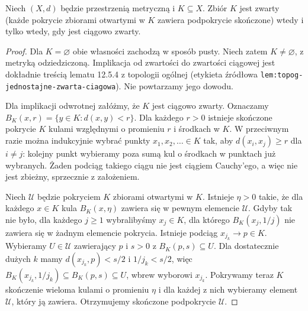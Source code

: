 \begin{twierdzenie}
\label{ma2:thm:metric-seqcompact}
Niech $(X,d)$ będzie przestrzenią metryczną i $K\subseteq X$.
Zbiór $K$ jest zwarty (każde pokrycie zbiorami otwartymi
w $K$ zawiera podpokrycie skończone) wtedy i tylko wtedy,
gdy jest ciągowo zwarty.
\end{twierdzenie}
\begin{proof}
Dla $K=\varnothing$ obie własności zachodzą w sposób pusty.
Niech zatem $K\ne\varnothing$, z metryką odziedziczoną.
Implikacja od zwartości do zwartości ciągowej jest
dokładnie treścią lematu 12.5.4 z topologii ogólnej
(etykieta źródłowa \texttt{lem:topog-jednostajne-zwarta-ciagowa}).
Nie powtarzamy jego dowodu.

Dla implikacji odwrotnej załóżmy, że $K$ jest ciągowo zwarty.
Oznaczamy $B_K(x,r)=\{y\in K:d(x,y)<r\}$. Dla każdego
$r>0$ istnieje skończone pokrycie $K$ kulami względnymi
o promieniu $r$ i środkach w $K$. W przeciwnym razie
można indukcyjnie wybrać punkty $x_1,x_2,\ldots\in K$
tak, aby $d(x_i,x_j)\ge r$ dla $i\ne j$: kolejny punkt
wybieramy poza sumą kul o środkach w punktach już wybranych.
Żaden podciąg takiego ciągu nie jest ciągiem Cauchy'ego,
a więc nie jest zbieżny, sprzecznie z założeniem.

Niech $\mathcal U$ będzie pokryciem $K$ zbiorami otwartymi
w $K$. Istnieje $\eta>0$ takie, że dla każdego $x\in K$
kula $B_K(x,\eta)$ zawiera się w pewnym elemencie
$\mathcal U$. Gdyby tak nie było, dla każdego $j\ge1$
wybralibyśmy $x_j\in K$, dla którego $B_K(x_j,1/j)$
nie zawiera się w żadnym elemencie pokrycia.
Istnieje podciąg $x_{j_k}\to p\in K$. Wybieramy
$U\in\mathcal U$ zawierający $p$ i $s>0$ z
$B_K(p,s)\subseteq U$. Dla dostatecznie dużych $k$
mamy $d(x_{j_k},p)<s/2$ i $1/j_k<s/2$, więc
$B_K(x_{j_k},1/j_k)\subseteq B_K(p,s)\subseteq U$,
wbrew wyborowi $x_{j_k}$.
Pokrywamy teraz $K$ skończenie wieloma kulami
o promieniu $\eta$ i dla każdej z nich wybieramy element
$\mathcal U$, który ją zawiera. Otrzymujemy skończone
podpokrycie $\mathcal U$.
\end{proof}


